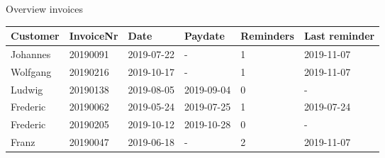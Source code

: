 \documentclass[a4paper]{article}
\begin{document}
\large{Overview invoices}

\vspace{8mm}

\begin{tabular}{llllll}\\ \hline
{\bfseries Customer} &
{\bfseries InvoiceNr} &
{\bfseries Date} &
{\bfseries Paydate} &
{\bfseries Reminders} &
{\bfseries Last reminder} \\ \hline\hline
Johannes &20190091 &2019-07-22 &- &1 &2019-11-07 \\Wolfgang &20190216 &2019-10-17 &- &1 &2019-11-07 \\Ludwig &20190138 &2019-08-05 &2019-09-04 &0 &- \\Frederic &20190062 &2019-05-24 &2019-07-25 &1 &2019-07-24 \\Frederic &20190205 &2019-10-12 &2019-10-28 &0 &- \\Franz &20190047 &2019-06-18 &- &2 &2019-11-07\\\hline
\end{tabular}
\end{document}

